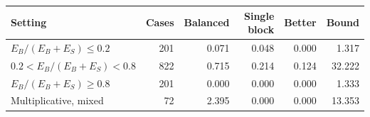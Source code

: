 \begin{tabular}{lrrrrr}
\toprule
Setting & Cases & Balanced & Single block & Better & Bound \\
\midrule
$E_B/(E_B+E_S)\le0.2$ & 201 & 0.071 & 0.048 & 0.000 & 1.317 \\
$0.2<E_B/(E_B+E_S)<0.8$ & 822 & 0.715 & 0.214 & 0.124 & 32.222 \\
$E_B/(E_B+E_S)\ge0.8$ & 201 & 0.000 & 0.000 & 0.000 & 1.333 \\
Multiplicative, mixed & 72 & 2.395 & 0.000 & 0.000 & 13.353 \\
\bottomrule
\end{tabular}
